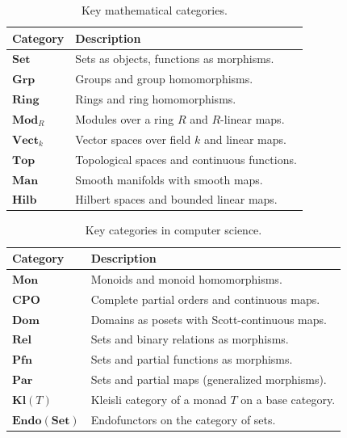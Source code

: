 \begin{table}[h!]
  \centering
  \begin{tabular}{ll}
    \hline
    \textbf{Category} & \textbf{Description} \\
    \hline
    $\mathbf{Set}$      & Sets as objects, functions as morphisms. \\
    $\mathbf{Grp}$      & Groups and group homomorphisms. \\
    $\mathbf{Ring}$     & Rings and ring homomorphisms. \\
    $\mathbf{Mod}_R$    & Modules over a ring $R$ and $R$-linear maps. \\
    $\mathbf{Vect}_k$   & Vector spaces over field $k$ and linear maps. \\
    $\mathbf{Top}$      & Topological spaces and continuous functions. \\
    $\mathbf{Man}$      & Smooth manifolds with smooth maps. \\
    $\mathbf{Hilb}$     & Hilbert spaces and bounded linear maps. \\
    \hline
  \end{tabular}
  \caption{Key mathematical categories.}
  \label{tab:math-categories}
\end{table}

\begin{table}[h!]
  \centering
  \begin{tabular}{ll}
    \hline
    \textbf{Category} & \textbf{Description} \\
    \hline
    $\mathbf{Mon}$ & Monoids and monoid homomorphisms. \\
    $\mathbf{CPO}$        & Complete partial orders and continuous maps. \\
    $\mathbf{Dom}$        & Domains as posets with Scott-continuous maps. \\
    $\mathbf{Rel}$        & Sets and binary relations as morphisms. \\
    $\mathbf{Pfn}$        & Sets and partial functions as morphisms. \\
    $\mathbf{Par}$        & Sets and partial maps (generalized morphisms). \\
    $\mathbf{Kl}(T)$      & Kleisli category of a monad $T$ on a base category. \\
    $\mathbf{Endo(Set)}$  & Endofunctors on the category of sets. \\
    \hline
  \end{tabular}
  \caption{Key categories in computer science.}
  \label{tab:cs-categories}
\end{table}

